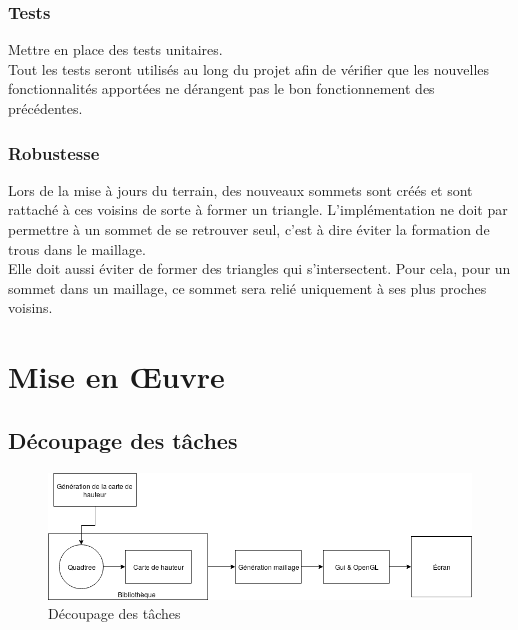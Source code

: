 \documentclass[12pt]{report}
\begin{document}
\subsection{Tests}

Mettre en place des tests unitaires.\\
Tout les tests seront utilisés au long du projet afin de vérifier que
les nouvelles fonctionnalités apportées ne dérangent pas le bon
fonctionnement des précédentes.

\subsection{Robustesse}

Lors de la mise à jours du terrain, des nouveaux sommets sont créés et
sont rattaché à ces voisins de sorte à former un triangle.
L'implémentation ne doit par permettre à un sommet de se retrouver seul,
c'est à dire éviter la formation de trous dans le maillage.\\
Elle doit aussi éviter de former des triangles qui s'intersectent.  Pour
cela, pour un sommet dans un maillage, ce sommet sera relié uniquement à
ses plus proches voisins.

\newpage

\chapter*{Mise en Œuvre}
\setcounter{chapter}{4}




\section{Découpage des tâches}

\begin{center}
\begin{figure}[!h]
  \includegraphics[scale=0.5]{img/DecoupageTache.png}
  \caption{Découpage des tâches}
  \label{fig:tache}
\end{figure}
\end{center}
\end{document}
